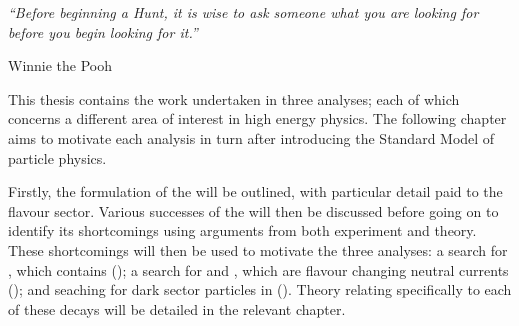 
\begin{minipage}{\textwidth}
  {\it ``Before beginning a Hunt, it is wise to ask someone what you are looking for before you
  begin looking for it.''}

  {\hfill Winnie the Pooh}
\end{minipage}

\vspace{2em}

This thesis contains the work undertaken in three analyses; each of which concerns a different area
of interest in high energy physics.
The following chapter aims to motivate each analysis in turn after introducing the Standard Model
of particle physics.

Firstly, the formulation of the \sm will be outlined, with particular detail paid to the flavour
sector.
Various successes of the \sm will then be discussed before going on to identify its shortcomings
using arguments from both experiment and theory.
These shortcomings will then be used to motivate the three analyses:
a search for \btodsphi, which contains  ();
a search for \btokpipimumu and \btophikmumu, which are flavour changing neutral currents
();
and seaching for dark sector particles in \btokstmumu ().
Theory relating specifically to each of these decays will be detailed in the relevant chapter.


